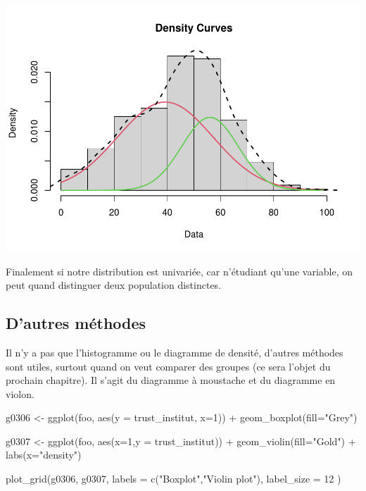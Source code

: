 \documentclass[
]{book}
\newenvironment{Shaded}{\begin{snugshade}}{\end{snugshade}}
\newcommand{\AttributeTok}[1]{\textcolor[rgb]{0.77,0.63,0.00}{#1}}
\newcommand{\DecValTok}[1]{\textcolor[rgb]{0.00,0.00,0.81}{#1}}
\newcommand{\FunctionTok}[1]{\textcolor[rgb]{0.00,0.00,0.00}{#1}}
\newcommand{\NormalTok}[1]{#1}
\newcommand{\OtherTok}[1]{\textcolor[rgb]{0.56,0.35,0.01}{#1}}
\newcommand{\SpecialCharTok}[1]{\textcolor[rgb]{0.00,0.00,0.00}{#1}}
\newcommand{\StringTok}[1]{\textcolor[rgb]{0.31,0.60,0.02}{#1}}
\begin{document}
\includegraphics{bookdown-demo_files/figure-latex/307-2.pdf}

Finalement si notre distribution est univariée, car n'étudiant qu'une variable, on peut quand distinguer deux population distinctes.

\hypertarget{dautres-muxe9thodes}{%
\subsection{D'autres méthodes}\label{dautres-muxe9thodes}}

Il n'y a pas que l'histogramme ou le diagramme de densité, d'autres méthodes sont utiles, surtout quand on veut comparer des groupes (ce sera l'objet du prochain chapitre). Il s'agit du diagramme à moustache et du diagramme en violon.

\begin{Shaded}
\begin{Highlighting}[]
\NormalTok{g0306 }\OtherTok{\textless{}{-}} \FunctionTok{ggplot}\NormalTok{(foo, }\FunctionTok{aes}\NormalTok{(}\AttributeTok{y =}\NormalTok{ trust\_institut, }\AttributeTok{x=}\DecValTok{1}\NormalTok{)) }\SpecialCharTok{+} 
\FunctionTok{geom\_boxplot}\NormalTok{(}\AttributeTok{fill=}\StringTok{"Grey"}\NormalTok{) }

\NormalTok{g0307 }\OtherTok{\textless{}{-}} \FunctionTok{ggplot}\NormalTok{(foo, }\FunctionTok{aes}\NormalTok{(}\AttributeTok{x=}\DecValTok{1}\NormalTok{,}\AttributeTok{y =}\NormalTok{ trust\_institut)) }\SpecialCharTok{+} 
\FunctionTok{geom\_violin}\NormalTok{(}\AttributeTok{fill=}\StringTok{"Gold"}\NormalTok{) }\SpecialCharTok{+} \FunctionTok{labs}\NormalTok{(}\AttributeTok{x=}\StringTok{"density"}\NormalTok{)}

\FunctionTok{plot\_grid}\NormalTok{(g0306, g0307, }\AttributeTok{labels =} \FunctionTok{c}\NormalTok{(}\StringTok{"Boxplot"}\NormalTok{,}\StringTok{"Violin plot"}\NormalTok{),}
  \AttributeTok{label\_size =} \DecValTok{12}
\NormalTok{)}
\end{Highlighting}
\end{Shaded}
\end{document}
